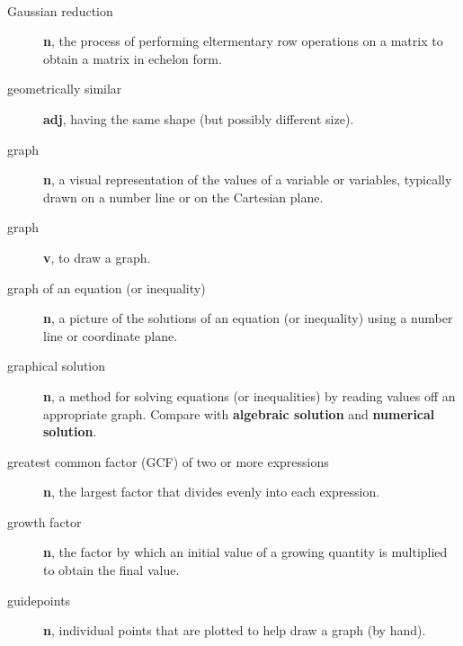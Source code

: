 \documentclass[10pt,]{book}
\newcommand{\terminology}[1]{\textbf{#1}}
\theoremstyle{plain}
\theoremstyle{definition}
\theoremstyle{definition}
\theoremstyle{definition}
\numberwithin{equation}{part}
\begin{document}
\paragraph[{}]{}\hypertarget{paragraphs-11}{}
\leavevmode%
\begin{description}
\item[{Gaussian reduction}]\hypertarget{li-597}{}\terminology{n}, the process of performing eltermentary row operations on a matrix to obtain a matrix in echelon form.%
\item[{geometrically similar}]\hypertarget{li-598}{}\terminology{adj}, having the same shape (but possibly different size).%
\item[{graph}]\hypertarget{li-599}{}\terminology{n}, a visual representation of the values of a variable or variables, typically drawn on a number line or on the Cartesian plane.%
\item[{graph}]\hypertarget{li-600}{}\terminology{v}, to draw a graph.%
\item[{graph of an equation (or inequality)}]\hypertarget{li-601}{}\terminology{n}, a picture of the solutions of an equation (or inequality) using a number line or coordinate plane.%
\item[{graphical solution}]\hypertarget{li-602}{}\terminology{n}, a method for solving equations (or inequalities) by reading values off an appropriate graph. Compare with \terminology{algebraic solution} and \terminology{numerical solution}.%
\item[{greatest common factor (GCF) of two or more expressions}]\hypertarget{li-603}{}\terminology{n}, the largest factor that divides evenly into each expression.%
\item[{growth factor}]\hypertarget{li-604}{}\terminology{n}, the factor by which an initial value of a growing quantity is multiplied to obtain the final value.%
\item[{guidepoints}]\hypertarget{li-605}{}\terminology{n}, individual points that are plotted to help draw a graph (by hand).%
\end{description}
%
\typeout{************************************************}
\typeout{************************************************}
\end{document}
